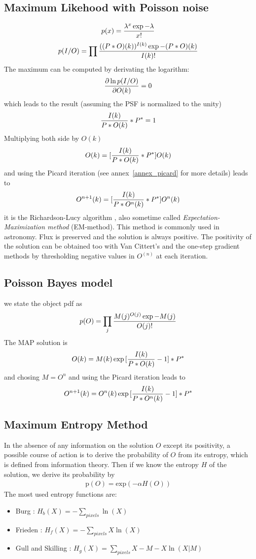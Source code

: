 \documentclass[11pt,a4paper]{article}
\newcommand{\be}{\begin{eqnarray}}
\newcommand{\ee}{\end{eqnarray}}
\begin{document}
\subsection{Maximum Likehood with Poisson noise}
\be
p(x) = {\lambda^x \exp{-\lambda} \over x!}
\ee
\be
p(I/O) = \prod {((P*O)(k))^{I(k)} \exp{-(P*O)(k)} \over I(k)!}
\ee
The maximum can be computed by derivating the logarithm:
\be
{\partial \ln p(I/O) \over \partial O(k)} = 0
\ee
which leads to the result (assuming the PSF is normalized to the unity)
\be
{I(k) \over P*O(k)}*P^* = 1
\ee
Multiplying both side by $O(k)$
\be
O(k) = [{I(k) \over P*O(k)}*P^*] O(k)
\ee
and using the Picard iteration \cite{ima:picard66} 
(see annex~\ref{annex_picard} for more details) leads to
\be
O^{n+1}(k) = [{I(k) \over P*O^{n}(k)}*P^*] O^{n}(k)
\ee
it is the Richardson-Lucy algorithm \cite{rest:richardson72,rest:lucy74},
also sometime called {\em Expectation-Maximization method} (EM-method).
This method is commonly used in astronomy.
Flux is preserved and the solution is always positive. The positivity 
of the solution can be obtained too with Van Cittert's and the 
one-step gradient
methods by thresholding negative values in $O^{(n)}$ at each iteration.

\subsection{Poisson Bayes model}
we state the object pdf as
\be
p(O) = \prod_j {M(j)^{O(j)} \exp{-M(j)} \over O(j) !}
\ee
The MAP solution is
\be
O(k) = M(k) \exp{[{I(k) \over P*O(k)} -1 ] * P^*}
\ee
and chosing $M = O^n$ and using the Picard iteration leads to
\be
O^{n+1}(k) = O^{n}(k) \exp{[{I(k) \over P*O^{n}(k)} -1 ] * P^*}
\ee

\subsection{Maximum Entropy Method}
In the absence of any information on the solution 
$O$ except its positivity, a possible course of action 
is to derive the probability
of $O$ from its entropy, which is defined from information theory.
Then if we know the entropy $H$ of the solution, 
we derive its probability by
\be
\mathrm{p}(O) = \mathrm{exp}(- \alpha H(O))
\ee
The most used entropy functions are:
\begin{itemize}
\item Burg \cite{entropy:burg67}:
$H_b(X) = -\sum_{pixels} \ln(X) $
\item Frieden \cite{entropy:frieden75}:
$H_f(X) = -\sum_{pixels}X \ln(X)$
\item Gull and Skilling \cite{entropy:gull91}:
$H_g(X) = \sum_{pixels} X - M - X \ln(X|M)$
\end{itemize}
\end{document}
